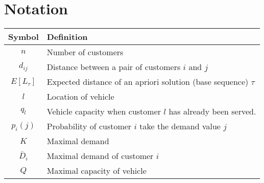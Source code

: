 \chapter*{Notation}
\label{chap:notation}

\begin{table}
 \begin{tabular}{|c|l|}
  \hline
  \textbf{Symbol} & \textbf{Definition}\\
  \hline
  $n$ & Number of customers\\
  $d_{ij}$ & Distance between a pair of customers $i$ and $j$\\
  $E[L_{\tau}]$ & Expected distance of an apriori solution (base sequence) $\tau$\\
  $l$ & Location of vehicle\\
  $q_l$ & Vehicle capacity when customer $l$ has already been served.\\
  $p_i(j)$ & Probability of customer $i$ take the demand value $j$\\
  $K$ & Maximal demand\\
  $\bar{D}_i$ & Maximal demand of customer $i$\\
  $Q$ & Maximal capacity of vehicle\\
  \hline
 \end{tabular}

\end{table}
